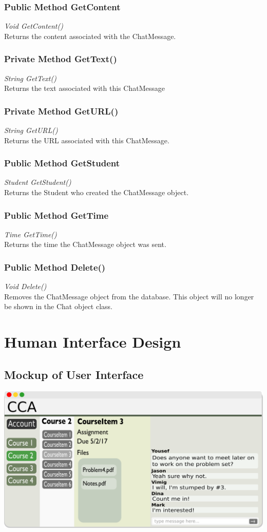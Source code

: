 \documentclass{scrreprt}
\begin{document}
\subsection{Public Method GetContent}
\textit{Void GetContent()} \\
Returns the content associated with the ChatMessage.

\subsection{Private Method GetText()}
\textit{String GetText()} \\
Returns the text associated with this ChatMessage

\subsection{Private Method GetURL()}
\textit{String GetURL()} \\
Returns the URL associated with this ChatMessage.

\subsection{Public Method GetStudent}
\textit{Student GetStudent()} \\
Returns the Student who created the ChatMessage object.

\subsection{Public Method GetTime}
\textit{Time GetTime()} \\
Returns the time the ChatMessage object was sent.

\subsection{Public Method Delete()}
\textit{Void Delete()} \\
Removes the ChatMessage object from the database. This object will no longer be shown in the Chat object class.


\chapter{Human Interface Design}

\section{Mockup of User Interface}

\includegraphics[width=1.0\textwidth]{diagrams/UI_Mockup.png}
\end{document}
